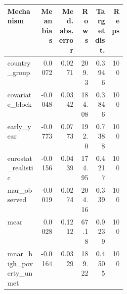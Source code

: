 \begin{tabular}{p{0.28\linewidth}rrrrr}
\toprule
Mechanism & Mean bias & Med. abs. error & Rows & Target dist. & Reps \\
\midrule
country\_group & 0.0072 & 0.0271 & 209.3 & 0.3946 & 100 \\
covariate\_block & -0.0048 & 0.0342 & 184.08 & 0.3846 & 100 \\
early\_year & -0.0773 & 0.0773 & 192.0 & 0.7388 & 100 \\
eurostat\_realistic & -0.0156 & 0.0439 & 174.95 & 0.4217 & 100 \\
mar\_observed & -0.0019 & 0.0274 & 204.16 & 0.339 & 100 \\
mcar & 0.0028 & 0.1212 & 67.18 & 0.9239 & 100 \\
mnar\_high\_poverty\_unmet & -0.0164 & 0.0329 & 189.22 & 0.4505 & 100 \\
\bottomrule
\end{tabular}
